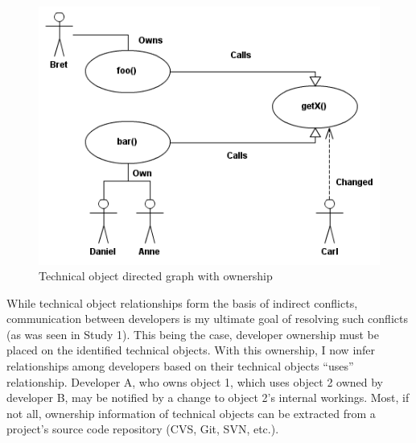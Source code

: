 \begin{figure}[t!]
\includegraphics[width=\columnwidth]{figures/CallGraph}
\caption{Technical object directed graph with ownership\label{fig:graph}}
\end{figure}

While technical object relationships form the basis of indirect conflicts,
communication between developers is my ultimate goal of resolving such conflicts
(as was seen in Study 1).
This being the case, developer ownership must be placed on the 
identified technical objects. With this ownership, I now infer
relationships among developers based on their technical objects
``uses'' relationship. Developer A, who owns object 1, which uses 
object 2 owned by developer B, may be notified by a change to
object 2's internal workings. Most, if not all, ownership information
of technical objects can be extracted from a project's source code
repository (CVS, Git, SVN, etc.).


